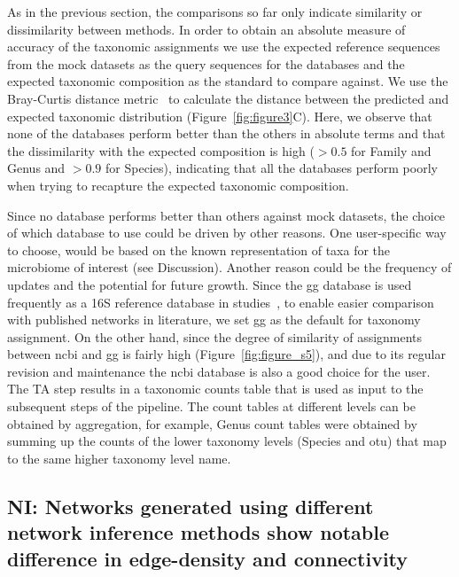   As in the previous section, the comparisons so far only indicate similarity or dissimilarity between methods.
  In order to obtain an absolute measure of accuracy of the taxonomic assignments we use the expected reference sequences from the mock datasets as the query sequences for the databases and the expected taxonomic composition as the standard to compare against.
  We use the Bray-Curtis distance metric~\cite{virtanenSciPyFundamentalAlgorithms2020} to calculate the distance between the predicted and expected taxonomic distribution (Figure~\ref{fig:figure3}C).
  Here, we observe that none of the databases perform better than the others in absolute terms and that the dissimilarity with the expected composition is high ($>0.5$ for Family and Genus and $>0.9$ for Species), indicating that all the databases perform poorly when trying to recapture the expected taxonomic composition.

  Since no database performs better than others against mock datasets, the choice of which database to use could be driven by other reasons.
  One user-specific way to choose, would be based on the known representation of taxa for the microbiome of interest (see Discussion).
  Another reason could be the frequency of updates and the potential for future growth.
  Since the \ac{gg} database is used frequently as a 16S reference database in studies~\cite{Balvociute2017}, to enable easier comparison with published networks in literature, we set \ac{gg} as the default for taxonomy assignment.
  On the other hand, since the degree of similarity of assignments between \ac{ncbi} and \ac{gg} is fairly high (Figure~\ref{fig:figure_s5}), and due to its regular revision and maintenance the \ac{ncbi} database is also a good choice for the user.
  The TA step results in a taxonomic counts table that is used as input to the subsequent steps of the pipeline.
  The count tables at different levels can be obtained by aggregation, for example, Genus count tables were obtained by summing up the counts of the lower taxonomy levels (Species and \ac{otu}) that map to the same higher taxonomy level name.

  \FloatBarrier

  \subsection*{NI: Networks generated using different network inference methods show notable difference in edge-density and connectivity}

